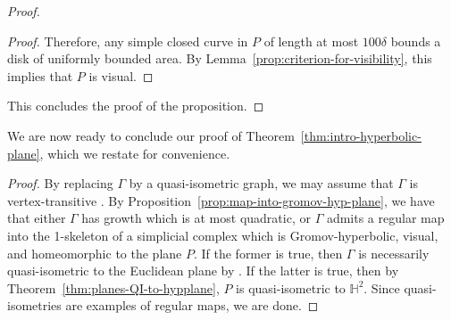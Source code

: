 \documentclass[11pt,a4paper]{amsart}
\newcommand{\bbH}{\mathbb{H}}
\newcommand{\joe}[1]{\todo[color=yellow]{\scriptsize{Joe: #1}}}
\newtheorem{proposition}[theorem]{Proposition}
\theoremstyle{definition}
\begin{document}
\begin{proof}
\begin{proof}
            Therefore, any simple closed curve in $P$ of length at most $100\delta$ bounds a disk of uniformly bounded area. By Lemma~\ref{prop:criterion-for-visibility}, this implies that $P$ is visual. 
        \end{proof}

        This concludes the proof of the proposition.
\end{proof}

We are now ready to conclude our proof of Theorem~\ref{thm:intro-hyperbolic-plane}, which we restate for convenience.

\mapintohypplane*

\begin{proof}
	By replacing $\Gamma$ by a quasi-isometric graph, we may assume that $\Gamma$ is vertex-transitive \cite[Prop.~5.1]{woess1994topological}. By Proposition~\ref{prop:map-into-gromov-hyp-plane}, we have that either $\Gamma$ has growth which is at most quadratic, or $\Gamma$ admits a regular map into the 1-skeleton of a simplicial complex which is Gromov-hyperbolic, visual, and homeomorphic to the plane $P$. 
    If the former is true, then $\Gamma$ is necessarily quasi-isometric to the Euclidean plane by \cite{woess1994topological}. If the latter is true, then by Theorem~\ref{thm:planes-QI-to-hypplane}, $P$ is quasi-isometric to $\mathbb H^2$. Since quasi-isometries are examples of regular maps, we are done. 
\end{proof}





\end{document}
